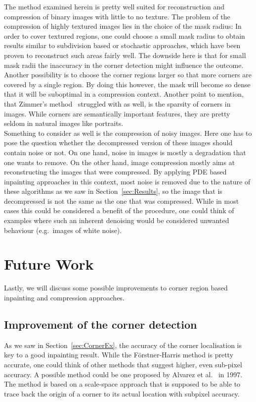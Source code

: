 The method examined herein is pretty well suited for reconstruction and compression of binary images
with little to no texture. 
The problem of the compression of highly textured images lies in the choice of the mask radius:
In order to cover textured regions, one could choose a small mask radius to obtain results similar
to subdivision based or stochastic approaches, which have been proven to reconstruct such areas
fairly well.
The downside here is that for small mask radii the
inaccuracy in the corner detection might influence the outcome. Another possibility is to choose
the corner regions larger so that more corners are covered by a single region. By doing this
however, the mask will become so dense that it will be suboptimal in a compression context.
Another point to mention, that Zimmer's method~\cite{zimmer07} struggled with as well, is the sparsity
of corners in images. While corners are semantically important features, they are pretty seldom in
natural images like portraits.\\
Something to consider as well is the compression of noisy images. Here one has to pose the question
whether the decompressed version of these images should contain noise or not. On one hand, noise in
images is mostly a degradation that one wants to remove. On the other hand, image compression
mostly aims at reconstructing the images that were compressed. By applying PDE based inpainting
approaches in this context, most noise is removed due to the nature of these algorithms as we saw
in Section~\ref{sec:Results}, so the image that is decompressed is not the same as the one that was
compressed. While in most cases this could be considered a benefit of the procedure, one could
think of examples where such an inherent denoising would be considered unwanted behaviour (e.g.\ images
of white noise).

\section{Future Work}\label{sec:FutureWork}

Lastly, we will discuss some possible improvements to corner region based inpainting and
compression approaches.

\subsection*{Improvement of the corner detection}

As we saw in Section~\ref{sec:CornerEx}, the accuracy of the corner localisation is key to a good
inpainting result. While the Förstner-Harris method is pretty accurate, one could think of other
methods that suggest higher, even sub-pixel accuracy. A possible method could be one proposed by
Alvarez et al.~\cite{amss} in 1997. \\
The method is based on a scale-space approach that is supposed
to be able to trace back the origin of a corner to its actual location with subpixel accuracy.

